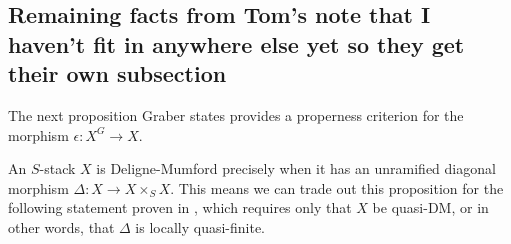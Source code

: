 \subsection{Remaining facts from Tom's note that I haven't fit in anywhere else yet so they get their own subsection}\label{rl-000K}




The next proposition Graber states provides a properness criterion for the morphism \(\epsilon:X^{G}\to X\).



An \(S\)-stack \(X\) is Deligne-Mumford precisely when it has an unramified diagonal morphism \(\Delta:X\to X\times_S X\). This means we can trade out this proposition for the following statement proven in  \cite{aranha-khan-latyntsev-etal_VirtualLocalizationRevisited2025}, which requires only that \(X\) be quasi-DM, or in other words, that \(\Delta\) is locally quasi-finite.





